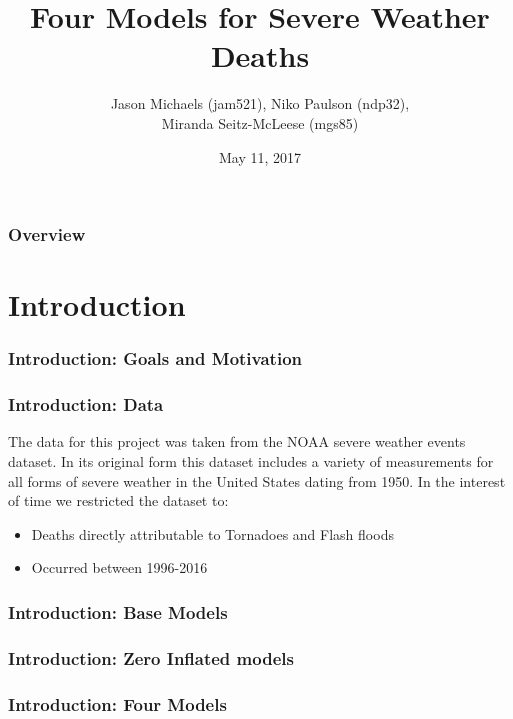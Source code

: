 \documentclass{beamer}
\title[Four Models]{Four Models for Severe Weather Deaths} %
\author{Jason Michaels (jam521), Niko Paulson (ndp32), \\Miranda Seitz-McLeese (mgs85) } %
\date{May 11, 2017} %
\begin{document}
	
	\begin{frame}
		\titlepage %
	\end{frame}
	
	\begin{frame}
		\frametitle{Overview} %
		\tableofcontents %
	\end{frame}
	
	\section{Introduction} 
	\begin{frame}
		\frametitle{Introduction: Goals and Motivation}
	\end{frame}
	\begin{frame}
		\frametitle{Introduction: Data}
		The data for this project was taken from the NOAA severe weather events dataset. 
		In its original form this dataset includes a variety of measurements for all forms of severe weather in the United States dating from 1950. In the interest of time we restricted the dataset to:
		\begin{itemize}
			\item Deaths directly attributable to Tornadoes and Flash floods 
			\item Occurred between 1996-2016
		\end{itemize}
	\end{frame}
	\begin{frame}
		\frametitle{Introduction: Base Models}
	\end{frame}
	\begin{frame}
		\frametitle{Introduction: Zero Inflated models}
	\end{frame}
	\begin{frame}
		\frametitle{Introduction: Four Models}
	\end{frame}
	
\end{document}
